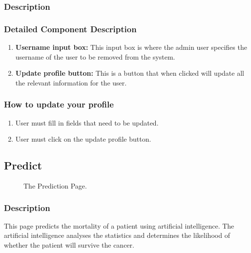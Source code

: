 \documentclass[14pt, a4paper]{article}
\begin{document}
	\subsubsection{Description} 
	\subsubsection{Detailed Component Description}
		\begin{enumerate}
			\item \textbf{Username input box:} This input box is where the admin user specifies the username of the user to be removed from the system.
			\item \textbf{Update profile button:} This is a button that when clicked will update all the relevant information for the user.
		\end{enumerate}
	\subsubsection{How to update your profile}
		\begin{enumerate}
			\item User must fill in fields that need to be updated.
			\item User must click on the update profile button.
		\end{enumerate}
\subsection{Predict}
	\begin{figure}[H]
		\centerline{}
		\caption{The Prediction Page.}
		\label{fig:predict1}
	\end{figure}
	\subsubsection{Description} This page predicts the mortality of a patient using artificial intelligence. The artificial intelligence analyses the statistics and determines the likelihood of whether the patient will survive the cancer.
\end{document}
